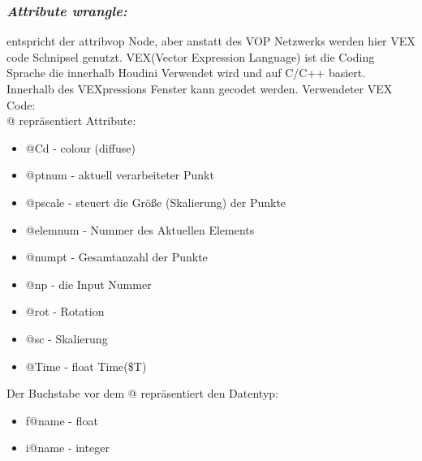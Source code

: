 \documentclass[paper=a4,fontsize=12pt,ngerman]{scrartcl}
\begin{document}
 	\subsubsection*{\textit{Attribute wrangle:}}
 	entspricht der attribvop Node, aber anstatt des VOP Netzwerks werden hier VEX code Schnipsel genutzt. VEX(Vector Expression Language) ist die Coding Sprache die innerhalb Houdini Verwendet wird und auf C/C++ basiert.
 	Innerhalb des VEXpressions Fenster kann gecodet werden.
 	Verwendeter VEX Code:\\
 	@ repräsentiert Attribute:
 	\begin{itemize}
 		\item @Cd - colour (diffuse) 
 		\item @ptnum - aktuell verarbeiteter Punkt
 		\item @pscale - steuert die Größe (Skalierung) der Punkte
 		\item @elemnum - Nummer des Aktuellen Elements
 		\item @numpt - Gesamtanzahl der Punkte
 		\item @np - die Input Nummer
 		\item @rot - Rotation
 		\item @sc - Skalierung
 		\item @Time - float Time(\$T)
 	\end{itemize}
 	
 	Der Buchstabe vor dem @ repräsentiert den Datentyp: 
 	\begin{itemize}
 		\item f@name - float
 		\item i@name - integer
 	\end{itemize}
 	
\end{document}

